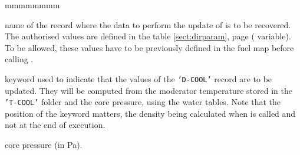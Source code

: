 \begin{ListeDeDescription}{mmmmmmmm}
\item[\dusa{rec2}] name of the record where the data to perform the update of 
 is to be recovered. The authorised values are defined in the table
\ref{sect:dirparam}, page \pageref{sect:dirparam} ( variable). 
To be allowed, these values have to be previously defined in the fuel
map before calling .

\item[\moc{TTD}] keyword used to indicate that the values of the {\tt 'D-COOL'}
record are to be updated. They will be computed from the moderator temperature
stored in the {\tt 'T-COOL'} folder and the core pressure, using the water tables.
Note that the position of the  keyword matters, the density being
calculated when  is called and not at the end of  execution.

\item[\dusa{pcore}] core pressure (in Pa).

\end{ListeDeDescription}

\eject

